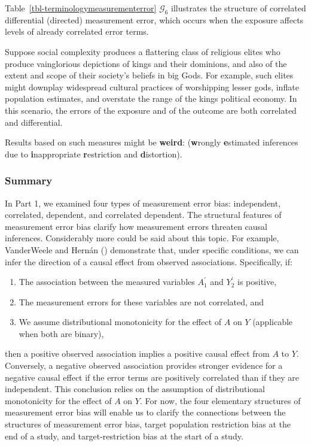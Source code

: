 \documentclass[
  single column]{article}
\providecommand{\tightlist}{%
  \setlength{\itemsep}{0pt}\setlength{\parskip}{0pt}}\usepackage{longtable,booktabs,array}
\begin{document}
Table~\ref{tbl-terminologymeasurementerror} \(\mathcal{G}_6\)
illustrates the structure of correlated differential (directed)
measurement error, which occurs when the exposure affects levels of
already correlated error terms.

Suppose social complexity produces a flattering class of religious
elites who produce vainglorious depictions of kings and their dominions,
and also of the extent and scope of their society's beliefs in big Gods.
For example, such elites might downplay widespread cultural practices of
worshipping lesser gods, inflate population estimates, and overstate the
range of the kings political economy. In this scenario, the errors of
the exposure and of the outcome are both correlated and differential.

Results based on such measures might be \textbf{weird}:
(\textbf{w}rongly \textbf{e}stimated inferences due to
\textbf{i}nappropriate \textbf{r}estriction and \textbf{d}istortion).

\subsubsection{Summary}\label{summary}

In Part 1, we examined four types of measurement error bias:
independent, correlated, dependent, and correlated dependent. The
structural features of measurement error bias clarify how measurement
errors threaten causal inferences. Considerably more could be said about
this topic. For example, VanderWeele and Hernán
() demonstrate that, under specific
conditions, we can infer the direction of a causal effect from observed
associations. Specifically, if:

\begin{enumerate}
\def\labelenumi{\arabic{enumi}.}
\tightlist
\item
  The association between the measured variables \(A^{\prime}_{1}\) and
  \(Y^{\prime}_{2}\) is positive,
\item
  The measurement errors for these variables are not correlated, and
\item
  We assume distributional monotonicity for the effect of \(A\) on \(Y\)
  (applicable when both are binary),
\end{enumerate}

then a positive observed association implies a positive causal effect
from \(A\) to \(Y\). Conversely, a negative observed association
provides stronger evidence for a negative causal effect if the error
terms are positively correlated than if they are independent. This
conclusion relies on the assumption of distributional monotonicity for
the effect of \(A\) on \(Y\). For now, the four elementary structures of
measurement error bias will enable us to clarify the connections between
the structures of measurement error bias, target population restriction
bias at the end of a study, and target-restriction bias at the start of
a study.
\end{document}
